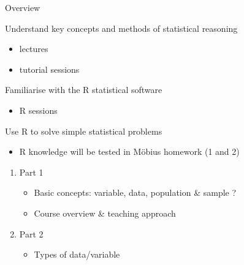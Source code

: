 \documentclass{beamer}
\begin{document}
\begin{frame}{Overview}

Understand  key concepts and methods of statistical
reasoning
\begin{itemize}
\item lectures
\item tutorial sessions
\end{itemize}

Familiarise with the R statistical software
\begin{itemize}
\item R sessions
\end{itemize}

Use R to solve simple statistical problems
\begin{itemize}
\item R knowledge will be tested in M\"obius homework (1 and 2)
\end{itemize}
\end{frame}



\begin{frame}


\begin{enumerate}
\item Part 1 
\begin{itemize}
\item Basic concepts: variable, data, population \& sample
?
\item Course overview \& teaching approach
\end{itemize}
\item Part 2 
\begin{itemize}
\item Types of data/variable

\end{itemize}


\end{enumerate}
\end{frame}
\end{document}
